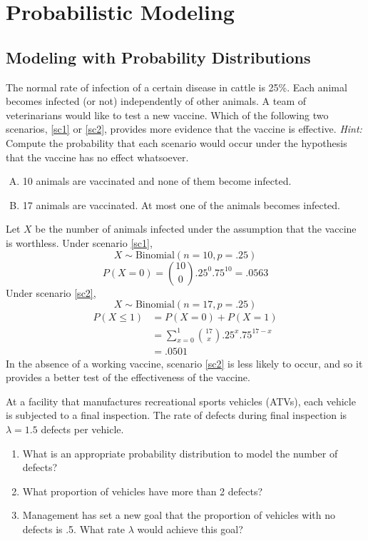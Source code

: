\chapter{Probabilistic Modeling}

\section{Modeling with Probability Distributions}

The normal rate of infection of a certain disease in cattle is
25\%.  Each animal becomes infected (or not) independently of other
animals.  A team of veterinarians would like to test a new
vaccine. Which of the following two scenarios, \ref{sc1} or \ref{sc2},
provides more evidence that the vaccine is effective.  \emph{Hint:}
Compute the probability that each scenario would occur under the
hypothesis that the vaccine has no effect whatsoever.
\begin{enumerate}[A)]
\item 10 animals are vaccinated and none of them become infected. \label{sc1}
\item 17 animals are vaccinated. At most one of the animals becomes infected. \label{sc2}
\end{enumerate}

Let $X$ be the number of animals infected under the assumption that
the vaccine is worthless.  Under scenario \ref{sc1},
\[ X \sim \text{Binomial}(n=10,p=.25) \]
\[ P(X = 0) = {10 \choose 0} .25^0 .75^{10} = .0563 \]
Under scenario \ref{sc2}, 
\[ X \sim \text{Binomial}(n=17,p=.25) \]
\begin{align*} P(X \leq 1) &= P(X=0) + P(X=1) \\
                 &= \sum_{x=0}^1 {17 \choose x} .25^x .75^{17-x} \\
                 &= .0501
\end{align*}
In the absence of a working vaccine, scenario \ref{sc2} is less likely to occur,
and so it provides a better test of the effectiveness of the vaccine.


At a facility that manufactures recreational sports
  vehicles (ATVs), each vehicle is subjected to a final
  inspection. The rate of defects during final inspection is
  $\lambda=1.5$ defects per vehicle.
\begin{enumerate}
\item What is an appropriate probability distribution to model the
number of defects? \label{atv1}
\item What proportion of vehicles have more than 2 defects? \label{atv2}
\item Management has set a new goal that the proportion
of vehicles with no defects is .5. What rate $\lambda$ would
achieve this goal? \label{atv3}
\end{enumerate}

